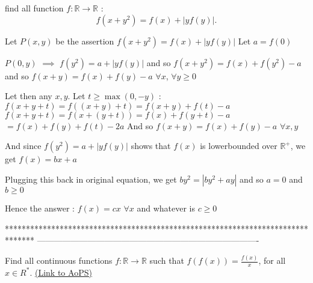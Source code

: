 \begin{solution}
	\begin{tcolorbox}find all function $ f:\mathbb{R}\to\mathbb{R} $ : \[ f(x+y^2)=f(x)+|yf(y)|. \]\end{tcolorbox}
Let $P(x,y)$ be the assertion $f(x+y^2)=f(x)+|yf(y)|$
Let $a=f(0)$

$P(0,y)$ $\implies$ $f(y^2)=a+|yf(y)|$ and so $f(x+y^2)=f(x)+f(y^2)-a$ and so $f(x+y)=f(x)+f(y)-a$ $\forall x$, $\forall y\ge 0$

Let then any $x,y$. Let $t\ge \max(0,-y)$ :
$f(x+y+t)=f((x+y)+t)=f(x+y)+f(t)-a$
$f(x+y+t)=f(x+(y+t))=f(x)+f(y+t)-a$ $=f(x)+f(y)+f(t)-2a$
And so $f(x+y)=f(x)+f(y)-a$ $\forall x,y$

And since $f(y^2)=a+|yf(y)|$ shows that $f(x)$ is lowerbounded over $\mathbb R^+$, we get $f(x)=bx+a$

Plugging this back in original equation, we get $by^2=|by^2+ay|$ and so $a=0$ and $b\ge 0$

Hence the answer : $\boxed{f(x)=cx}$ $\forall x$ and whatever is $c\ge 0$
\end{solution}
*******************************************************************************
-------------------------------------------------------------------------------

\begin{problem}
	Find all continuous  functions $f: \mathbb{R}\to\mathbb{R}$ such that $f(f(x))=\frac{f(x)}{x}$, for all $x{\in}R^{\ast}$.
	\flushright \href{https://artofproblemsolving.com/community/c6h566761}{(Link to AoPS)}
\end{problem}



